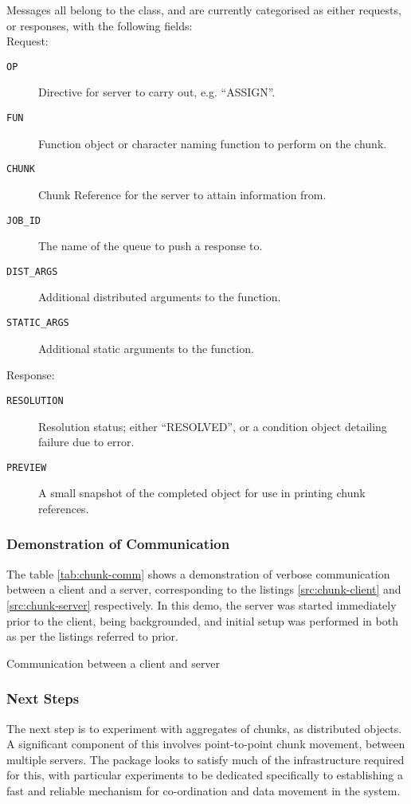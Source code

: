 Messages all belong to the  class, and are currently categorised as
either requests, or responses, with the following fields:\\

Request:
\begin{description}
	\item[\texttt{OP}] Directive for server to carry out, e.g. ``ASSIGN''.
	\item[\texttt{FUN}] Function object or character naming function to
		perform on the chunk.
	\item[\texttt{CHUNK}] Chunk Reference for the server to attain
		information from.
	\item[\texttt{JOB\_ID}] The name of the queue to push a response to.
	\item[\texttt{DIST\_ARGS}] Additional distributed arguments to the
		function.
	\item[\texttt{STATIC\_ARGS}] Additional static arguments to the
		function.
\end{description}

Response:
\begin{description}
	\item[\texttt{RESOLUTION}] Resolution status; either ``RESOLVED'', or a
		condition object detailing failure due to error.
	\item[\texttt{PREVIEW}]  A small snapshot of the completed object for
		use in printing chunk references.
\end{description}

\subsubsection{Demonstration of Communication}

The table \cref{tab:chunk-comm} shows a demonstration of verbose communication
between a client and a server, corresponding to the listings
\cref{src:chunk-client} and \cref{src:chunk-server} respectively.
In this demo, the server was started immediately prior to the client, being
backgrounded, and initial setup was performed in both as per the listings
referred to prior.

 {Communication between a client and server}

\subsubsection{Next Steps}

The next step is to experiment with aggregates of chunks, as distributed objects.
A significant component of this involves point-to-point chunk movement, between multiple servers.
The package  looks to satisfy much of the infrastructure required for
this, with particular experiments to be dedicated specifically to establishing
a fast and reliable mechanism for co-ordination and data movement in the system.


